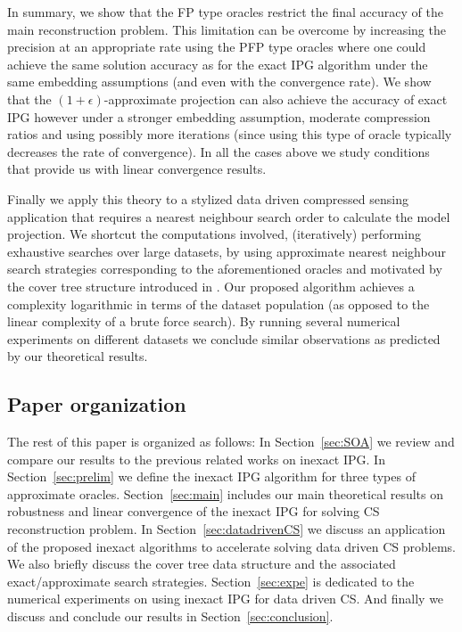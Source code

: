 In summary, we show that the FP type oracles restrict the final accuracy of the main reconstruction problem. 
This limitation can be overcome by increasing the precision at an appropriate rate using the PFP type oracles where one could achieve the same solution accuracy as for the exact IPG algorithm under the same embedding assumptions (and even with the convergence rate). We show that the $(1+\epsilon)$-approximate projection can also achieve the accuracy of exact IPG however under a stronger embedding assumption, moderate compression ratios and using possibly more iterations (since using this type of oracle typically decreases the rate of convergence). In all the cases above we study conditions that provide us with linear convergence results. 

Finally we apply this theory to a stylized data driven compressed sensing application that requires a nearest neighbour search order to calculate the model projection. We shortcut the computations involved,  (iteratively) performing exhaustive searches over large datasets, by using approximate nearest neighbour search strategies corresponding to the aforementioned oracles and motivated by the cover tree structure introduced in \cite{beygelzimer2006cover}. Our proposed algorithm achieves a complexity logarithmic  in terms of the dataset population (as opposed to the linear complexity of a brute force search). 
By running several numerical experiments on different  datasets we conclude similar observations as predicted by our theoretical results.
\subsection{Paper organization}
The rest of this paper is organized as follows: In Section~\ref{sec:SOA} we review and compare our results to the previous related works on inexact IPG. In Section~\ref{sec:prelim} we define the inexact IPG algorithm for three types of approximate oracles. Section~\ref{sec:main} includes our main theoretical results on robustness and linear convergence of the inexact IPG for solving CS reconstruction problem. %
 In  Section~\ref{sec:datadrivenCS} we discuss an application of the proposed inexact algorithms to accelerate solving data driven CS problems. We also briefly discuss the cover tree data structure and the associated exact/approximate search strategies.  Section~\ref{sec:expe} is dedicated to the numerical experiments on using inexact IPG for data driven CS. 
And finally we discuss and conclude our results in Section~\ref{sec:conclusion}.

